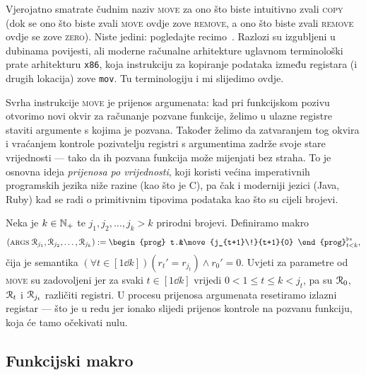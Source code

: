 \begin{napomena}[{name=[{terminologija makroa za kopiranje\slash premještanje registara}]}]
    Vjerojatno smatrate čudnim naziv \textsc{move} za ono što biste intuitivno zvali \textsc{copy} (dok se ono što biste zvali \textsc{move} ovdje zove \textsc{remove}, a ono što biste zvali \textsc{remove} ovdje se zove \textsc{zero}). Niste jedini: pogledajte recimo~\cite{url:movecopy}. Razlozi su izgubljeni u dubinama povijesti, ali moderne računalne arhitekture uglavnom terminološki prate arhitekturu \texttt{x86}, koja instrukciju za kopiranje podataka između registara (i drugih lokacija) zove \texttt{mov}. Tu terminologiju i mi slijedimo ovdje.
\end{napomena}

Svrha instrukcije \textsc{move} je prijenos argumenata: kad pri funkcijskom pozivu otvorimo novi okvir za računanje pozvane funkcije, želimo u ulazne registre staviti argumente s kojima je pozvana. Također želimo da zatvaranjem tog okvira i vraćanjem kontrole pozivatelju registri s argumentima zadrže svoje stare vrijednosti --- tako da ih pozvana funkcija može mijenjati bez straha. To je osnovna ideja \emph{prijenosa po vrijednosti}, koji koristi većina imperativnih programskih jezika niže razine (kao što je C), pa čak i moderniji jezici (Java, Ruby) kad se radi o primitivnim tipovima podataka kao što su cijeli brojevi.

Neka je $k\in{\mathbb N}_+$ te $j_1,j_2,\dotsc,j_k>k$ prirodni brojevi. %
 Definiramo makro
\begin{equation}
    (\textsc{args} \;\reg{j_1},\reg{j_2},\dotsc,\reg{j_k}):=\begin{prog} t.&\move{j_{t+1}\!}{t+1}{0}
    \end{prog}^{\flat*}_{t<k}\text,
\end{equation}
čija je semantika $(\forall t\in[1\dd k])(r_t'=r_{j_t})\land r_0'=0$. Uvjeti za parametre od \textsc{move} su zadovoljeni jer za svaki $t\in[1\dd k]$ vrijedi $0<1\le t\le k<j_t$, pa su $\mathcal R_{0}$, $\mathcal R_{t}$ i $\mathcal R_{j_t}$ različiti registri. U procesu prijenosa argumenata resetiramo izlazni registar --- što je u redu jer ionako slijedi prijenos kontrole na pozvanu funkciju, koja će tamo očekivati nulu.

\subsection{Funkcijski makro}

